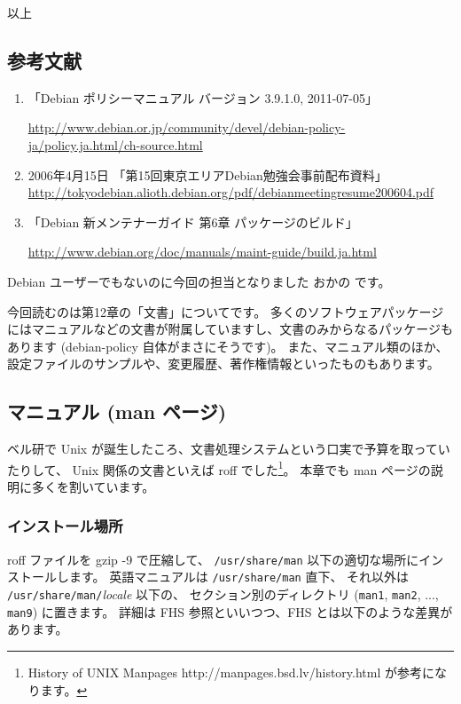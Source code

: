 \documentclass[mingoth,a4paper]{jsarticle}
\begin{document}
以上

\subsection{参考文献}
\begin{enumerate}
\item 「Debian ポリシーマニュアル バージョン 3.9.1.0, 2011-07-05」

  \url{http://www.debian.or.jp/community/devel/debian-policy-ja/policy.ja.html/ch-source.html}
\item 2006年4月15日 「第15回東京エリアDebian勉強会事前配布資料」\\
\url{http://tokyodebian.alioth.debian.org/pdf/debianmeetingresume200604.pdf}
\item 「Debian 新メンテナーガイド 第6章 パッケージのビルド」

\url{http://www.debian.org/doc/manuals/maint-guide/build.ja.html}

\end{enumerate}


Debian ユーザーでもないのに今回の担当となりました おかの です。

今回読むのは第12章の「文書」についてです。
多くのソフトウェアパッケージにはマニュアルなどの文書が附属していますし、文書のみからなるパッケージもあります (debian-policy 自体がまさにそうです)。
また、マニュアル類のほか、設定ファイルのサンプルや、変更履歴、著作権情報といったものもあります。

\subsection{マニュアル (man ページ)}
ベル研で Unix が誕生したころ、文書処理システムという口実で予算を取っていたりして、
Unix 関係の文書といえば roff でした\footnote{History of UNIX Manpages http://manpages.bsd.lv/history.html が参考になります。}。
本章でも man ページの説明に多くを割いています。

\subsubsection{インストール場所}
roff ファイルを gzip -9 で圧縮して、
{\tt /usr/share/man} 以下の適切な場所にインストールします。
英語マニュアルは {\tt /usr/share/man} 直下、
それ以外は {\tt /usr/share/man/}{\it locale} 以下の、
セクション別のディレクトリ ({\tt man1}, {\tt man2}, ..., {\tt man9}) に置きます。
詳細は FHS 参照といいつつ、FHS とは以下のような差異があります。
\end{document}
